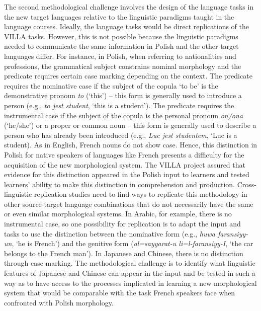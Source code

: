 \documentclass[12pt]{article}
\newenvironment{styleStandard}{\setlength\leftskip{0cm}\setlength\rightskip{0cm plus 1fil}\setlength\parindent{0cm}\setlength\parfillskip{0pt plus 1fil}\setlength\parskip{0cm plus 1pt}\writerlistparindent\writerlistleftskip\leavevmode\normalfont\normalsize\writerlistlabel\ignorespaces}{\unskip\vspace{0cm plus 1pt}\par}
\newcommand\writerlistleftskip{}
\newcommand\writerlistparindent{}
\newcommand\writerlistlabel{}
\begin{document}
\begin{styleStandard}
The second methodological challenge involves the design of the language tasks in the new target languages relative to the linguistic paradigms taught in the language courses. Ideally, the language tasks would be direct replications of the VILLA tasks. However, this is not possible because the linguistic paradigms needed to communicate the same information in Polish and the other target languages differ. For instance, in Polish, when referring to nationalities and professions, the grammatical subject constrains nominal morphology and the predicate requires certain case marking depending on the context. The predicate requires the nominative case if the subject of the copula ‘to be’ is the demonstrative pronoun \textit{to }(‘this’) – this form is generally used to introduce a person (e.g., \textit{to jest student}, ‘this is a student’). The predicate requires the instrumental case if the subject of the copula is the personal pronoun \textit{on/ona }(‘he/she’) or a proper or common noun – this form is generally used to describe a person who has already been introduced (e.g., \textit{Luc jest studentem}, ‘Luc is a student). As in English, French nouns do not show case. Hence, this distinction in Polish for native speakers of languages like French presents a difficulty for the acquisition of the new morphological system. The VILLA project assured that evidence for this distinction appeared in the Polish input to learners and tested learners’ ability to make this distinction in comprehension and production. Cross-linguistic replication studies need to find ways to replicate this methodology in other source-target language combinations that do not necessarily have the same or even similar morphological systems. In Arabic, for example, there is no instrumental case, so one possibility for replication is to adapt the input and tasks to use the distinction between the nominative form (e.g., \textit{huwa faransiyy-un}, ‘he is French’) and the genitive form (\textit{al=sayyarat-u li=l-faransiyy-I},\textit{ }‘the car belongs to the French man’). In Japanese and Chinese, there is no distinction through case marking. The methodological challenge is to identify what linguistic features of Japanese and Chinese can appear in the input and be tested in such a way as to have access to the processes implicated in learning a new morphological system that would be comparable with the task French speakers face when confronted with Polish morphology.
\end{styleStandard}
\end{document}

